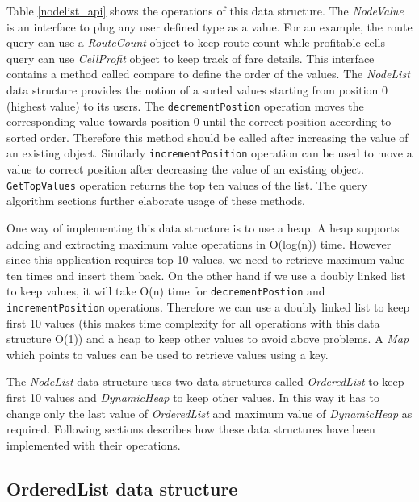 Table \ref{nodelist_api} shows the operations of this data structure. The \textit{NodeValue} is an interface to plug any user defined type as a value. For an example, the route query can use a \textit{RouteCount} object to keep route count while profitable cells query can use \textit{CellProfit} object to keep track of fare details. This interface contains a method called compare to define the order of the values. The \textit{NodeList} data structure provides the notion of a sorted values starting from position 0 (highest value) to its users. The \texttt{decrementPostion} operation moves the corresponding value towards position 0 until the correct position according to sorted order. Therefore this method should be called after increasing the value of an existing object. Similarly \texttt{incrementPosition} operation can be used to move a value to correct position after decreasing the value of an existing object. \texttt{GetTopValues} operation returns the top ten values of the list. The query algorithm sections further elaborate usage of these methods.

One way of implementing this data structure is to use a heap. A heap supports adding and extracting maximum value operations in O(log(n)) time. However since this application requires top 10 values, we need to retrieve maximum value ten times and insert them back. On the other hand if we use a doubly linked list to keep values, it will take O(n) time for  \texttt{decrementPostion} and \texttt{incrementPosition} operations. Therefore we can use a doubly linked list to keep first 10 values (this makes time complexity for all operations with this data structure O(1)) and a heap to keep other values to avoid above problems.  A \textit{Map} which points to values can be used to retrieve values using a key.

The \textit{NodeList} data structure uses two data structures called \textit{OrderedList} to keep first 10 values and \textit{DynamicHeap} to keep other values. In this way it has to change only the last value of \textit{OrderedList} and maximum value of \textit{DynamicHeap} as required. Following sections describes how these data structures have been implemented with their operations.

\subsection{OrderedList data structure}

